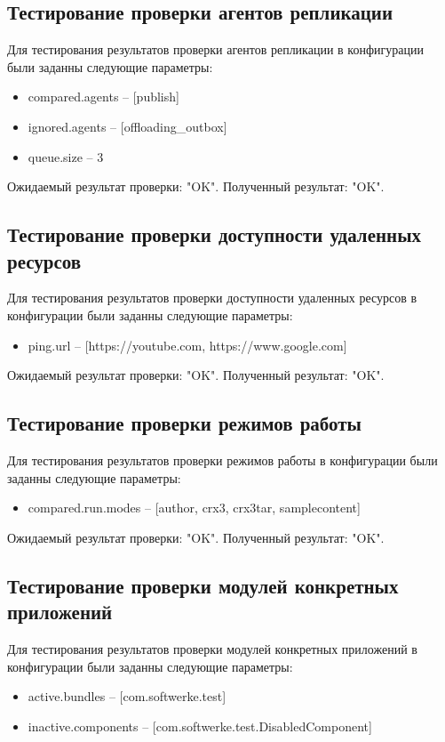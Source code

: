 \subsection{Тестирование проверки агентов репликации}
Для тестирования результатов проверки агентов репликации в конфигурации были заданны следующие параметры:
\begin{itemize}
\item compared.agents – [publish]
\item ignored.agents – [offloading\_outbox]
\item queue.size – 3
\end{itemize}

Ожидаемый результат проверки: "OK". Полученный результат: "OK".

\subsection{Тестирование проверки доступности удаленных ресурсов}
Для тестирования результатов проверки доступности удаленных ресурсов в конфигурации были заданны следующие параметры:
\begin{itemize}
\item ping.url – [https://youtube.com, https://www.google.com]
\end{itemize}

Ожидаемый результат проверки: "OK". Полученный результат: "OK".

\subsection{Тестирование проверки режимов работы}
Для тестирования результатов проверки режимов работы в конфигурации были заданны следующие параметры:
\begin{itemize}
\item compared.run.modes – [author, crx3, crx3tar, samplecontent]
\end{itemize}

Ожидаемый результат проверки: "OK". Полученный результат: "OK".


\subsection{Тестирование проверки модулей конкретных приложений}
Для тестирования результатов проверки модулей конкретных приложений в конфигурации были заданны следующие параметры:
\begin{itemize}
\item active.bundles – [com.softwerke.test]
\item inactive.components – [com.softwerke.test.DisabledComponent]
\end{itemize}

